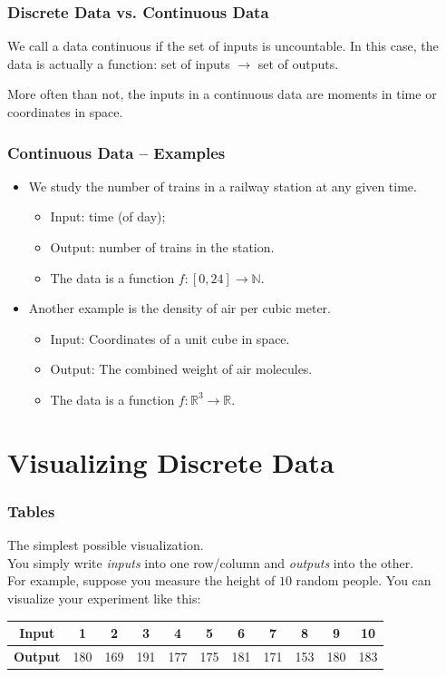 \documentclass[aspectratio=169,11pt,svgnames]{beamer}
\begin{document}
\begin{frame}
 \frametitle{Discrete Data vs. Continuous Data}
 \begin{tcolorbox}[title=Continuous Data]
  We call a data \alert{continuous} if the set of inputs is \alert{uncountable}.
  In this case, the data is actually a \alert{function}: set of inputs $ \to $
  set of outputs.
 \end{tcolorbox}
 \pause
 More often than not, the inputs in a continuous data are \alert{moments in
 time} or \alert{coordinates in space}.
\end{frame}

\begin{frame}
 \frametitle{Continuous Data -- Examples}
 \begin{itemize}[label=\textbullet]
  \item We study the number of trains in a railway station at any given time.
  \pause
  \begin{itemize}[label=\textminus]
   \item Input: time (of day);
   \pause
   \item Output: number of trains in the station.
   \pause
   \item The data is a function $f:[0,24] \to \mathbb{N}$.
  \end{itemize}
 \pause
 \item Another example is the density of air per cubic meter.
 \pause
 \begin{itemize}[label=\textminus] 
  \item Input: Coordinates of a unit cube in space.
  \pause
  \item Output: The combined weight of air molecules.
  \pause
  \item The data is a function $f:\mathbb{R}^3 \to \mathbb{R}$. 
 \end{itemize}
 \end{itemize}
\end{frame}

\section{Visualizing Discrete Data}

\begin{frame}
 \frametitle{Tables}
 The simplest possible visualization.\\
 \pause
 You simply write \emph{inputs} into one row/column and \emph{outputs} into the
 other.\\
 \pause
 For example, suppose you measure the height of $10$ random people. You can
 visualize your experiment like this:
 \pause
 \begin{center}
  \begin{tabular}{c|cccccccccc}
   \textbf{Input} & 1 & 2 & 3 & 4 & 5 & 6 & 7 & 8 & 9 & 10\\
   \midrule
   \textbf{Output} & 180 & 169 & 191 & 177 & 175 & 181 & 171 & 153 & 180 & 183
  \end{tabular}
 \end{center}
\end{frame}
\end{document}
